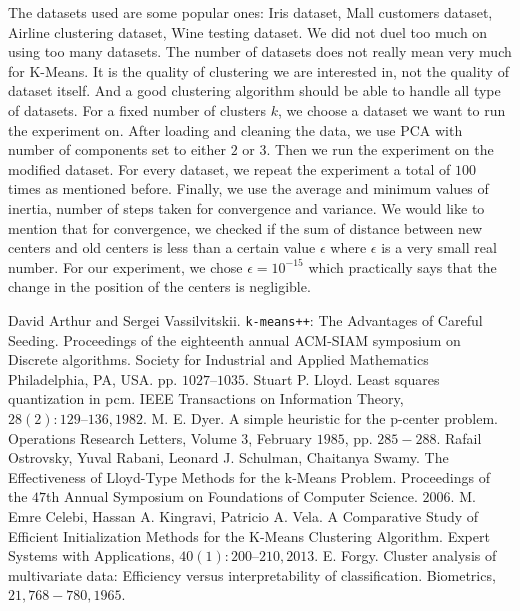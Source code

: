 \documentclass[10pt, leqno]{article}
\begin{document}
	The datasets used are some popular ones: Iris dataset, Mall customers dataset, Airline clustering dataset, Wine testing dataset. We did not duel too much on using too many datasets. The number of datasets does not really mean very much for K-Means. It is the quality of clustering we are interested in, not the quality of dataset itself. And a good clustering algorithm should be able to handle all type of datasets. For a fixed number of clusters $k$, we choose a dataset we want to run the experiment on. After loading and cleaning the data, we use PCA with number of components set to either $2$ or $3$. Then we run the experiment on the modified dataset. For every dataset, we repeat the experiment a total of $100$ times as mentioned before. Finally, we use the average and minimum values of inertia, number of steps taken for convergence and variance. We would like to mention that for convergence, we checked if the sum of distance between new centers and old centers is less than a certain value $\epsilon$ where $\epsilon$ is a very small real number. For our experiment, we chose $\epsilon=10^{-15}$ which practically says that the change in the position of the centers is negligible.
	\begin{thebibliography}{99}
		 David Arthur and Sergei Vassilvitskii. \texttt{k-means++}: The Advantages of Careful Seeding. Proceedings of the eighteenth annual ACM-SIAM symposium on Discrete algorithms. Society for Industrial and Applied Mathematics Philadelphia, PA, USA. pp. $1027–1035$.
		 Stuart P. Lloyd. Least squares quantization in pcm. IEEE Transactions on Information Theory, $28(2):129–136, 1982$.
		 M. E. Dyer. A simple heuristic for the p-center problem. Operations Research Letters, Volume $3$, February $1985$, pp. $285-288$.
		 Rafail Ostrovsky, Yuval Rabani, Leonard J. Schulman, Chaitanya Swamy. The Effectiveness of Lloyd-Type Methods for the k-Means Problem. Proceedings of the $47$th Annual Symposium on Foundations of Computer Science. $2006$.
		 M. Emre Celebi, Hassan A. Kingravi, Patricio A. Vela. A Comparative Study of Efficient Initialization Methods for the K-Means Clustering Algorithm. Expert Systems with Applications, $40(1): 200–210, 2013$.
		 E. Forgy. Cluster analysis of multivariate data: Efficiency versus interpretability of classification. Biometrics, $21, 768-780, 1965$.
	\end{thebibliography}
\end{document}
